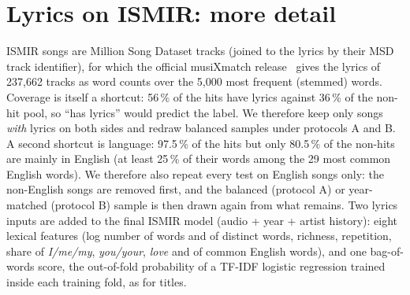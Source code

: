 \FloatBarrier
\section{Lyrics on ISMIR: more detail}\label{app:lyrics}
ISMIR songs are Million Song Dataset tracks (joined to the lyrics by their MSD track identifier), for which the official musiXmatch
release~\cite{bertinmahieux2011million} gives the lyrics of 237{,}662 tracks as word counts over the
5{,}000 most frequent (stemmed) words. Coverage is itself a shortcut: 56\,\% of the hits have lyrics against
36\,\% of the non-hit pool, so ``has lyrics'' would predict the label. We therefore keep only songs
\emph{with} lyrics on both sides and redraw balanced samples under protocols A and B. A second shortcut is
language: 97.5\,\% of the hits but only 80.5\,\% of the non-hits are mainly in English (at least 25\,\% of
their words among the 29 most common English words). We therefore also repeat every test on English songs
only: the non-English songs are removed first, and the balanced (protocol A) or year-matched (protocol B) sample is
then drawn again from what remains. Two lyrics inputs are added to the final ISMIR model (audio + year + artist history): eight lexical
features (log number of words and of distinct words, richness, repetition, share of \emph{I/me/my},
\emph{you/your}, \emph{love} and of common English words), and one bag-of-words score, the out-of-fold
probability of a TF-IDF logistic regression trained inside each training fold, as for titles.

